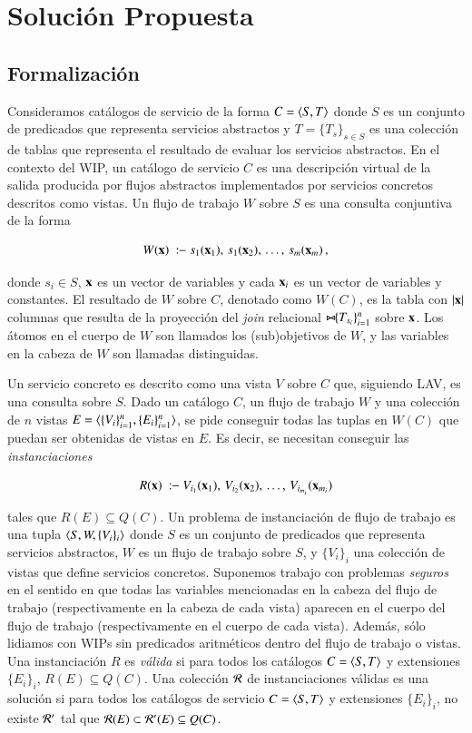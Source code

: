 \section{Solución Propuesta}

\subsection{Formalización}

Consideramos catálogos de servicio de la forma $C=\langle S,T \rangle$ donde $S$ es un
conjunto de predicados que representa servicios abstractos y $T=\{T_s\}_{s\in S}$ es una
colección de tablas que representa el resultado de evaluar los servicios
abstractos. En el contexto del WIP, un catálogo de servicio $C$ es una
descripción virtual de la salida producida por flujos abstractos
implementados por servicios concretos descritos como vistas. Un flujo de trabajo
$W$ sobre $S$ es una consulta conjuntiva de la forma

\[ W(\vvec{x})\ \qrule\ s_1(\vvec{x}_1),\,s_1(\vvec{x}_2),\,\ldots,\,s_m(\vvec{x}_m)\,, \]

donde $s_i\in S$, $\mathbf{x}$ es un vector de variables y cada $\mathbf{x}_i$ es un vector de variables y
constantes. El resultado de $W$ sobre $C$, denotado como $W(C)$, es la tabla con
 $|\mathbf{x}|$ columnas que resulta de la proyección del \emph{join} relacional
$\bowtie\!\!\{T_{s_i}\}_{i=1}^n$ sobre $\mathbf{x}$. Los átomos en el cuerpo de $W$ son llamados los
(sub)objetivos de $W$, y las variables en la cabeza de $W$ son llamadas
distinguidas.

Un servicio concreto es descrito como una vista $V$ sobre $C$ que, siguiendo
LAV, es una consulta sobre $S$. Dado un catálogo $C$, un flujo de trabajo $W$ y
una colección de $n$ vistas $E=\langle \{V_i\}_{i=1}^n,\{E_i\}_{i=1}^n \rangle$, se pide
conseguir todas las tuplas en
$W(C)$ que puedan ser obtenidas de vistas en $E$. Es decir, se necesitan
conseguir las \emph{instanciaciones}

\[ R(\vvec{x})\ \qrule\ V_{i_1}(\vvec{x}_1),\,V_{i_2}(\vvec{x}_2),\,\ldots,\,V_{i_{m_i}}(\vvec{x}_{m_i}) \]

tales que $R(E) \subseteq Q(C)$.
Un problema de instanciación de flujo de trabajo es una
tupla $\langle S,W,\{V_i\}_i \rangle$ donde $S$ es un conjunto de predicados
que representa servicios
abstractos, $W$ es un flujo de trabajo sobre $S$, y $\{V_i\}_i$ una colección de vistas
que define servicios concretos. Suponemos trabajo con problemas \emph{seguros}
en el sentido en que todas las variables mencionadas en la cabeza del flujo de
trabajo (respectivamente en la cabeza de cada vista) aparecen en el cuerpo del
flujo de trabajo (respectivamente en el cuerpo de cada vista). Además, sólo
lidiamos con WIPs sin predicados aritméticos dentro del flujo de trabajo o
vistas. Una instanciación $R$ es \emph{válida} si para todos los catálogos $C=\langle S,T \rangle$ y
extensiones $\{E_i\}_i$, $R(E)\subseteq Q(C)$. Una colección $\mathcal{R}$ de instanciaciones válidas es una
solución si para todos los catálogos de servicio $C=\langle S,T \rangle$ y extensiones $\{E_i\}_i$, no
existe $\mathcal{R}'$ tal que $\mathcal{R}(E)\subset\mathcal{R}'(E)\subseteq Q(C)$.

